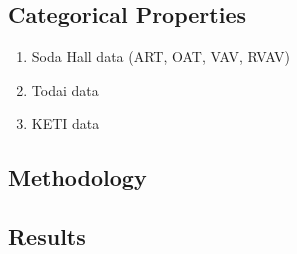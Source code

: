 \subsection{Categorical Properties}

\begin{enumerate}
\item Soda Hall data (ART, OAT, VAV, RVAV)
\item Todai data
\item KETI data
\end{enumerate}

\subsection{Methodology}

\subsection{Results}



